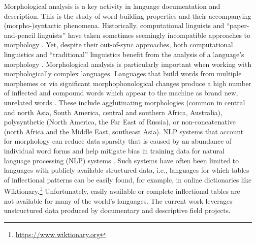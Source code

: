 Morphological analysis is a key activity in language documentation and description. This is the study of word-building properties and their accompanying (morpho-)syntactic phenomena. Historically, computational linguists and ``paper-and-pencil linguists'' have taken sometimes seemingly incompatible approaches to morphology \citep{sproat_1992,karttunen_2005}. Yet, despite their out-of-sync approaches, both computational linguistics and ``traditional'' linguistics benefit from the analysis of a language's morphology \citep{cotterell_labeled_2015}. Morphological analysis is particularly important when working with morphologically complex languages.  Languages that build words from multiple morphemes or via significant morphophonological changes produce a high number of inflected and compound words which appear to the machine as brand new, unrelated words \citep{dreyer_discovering_2011,goldsmith_computational_2017,hammarstrom_unsupervised_2011,kann_neural_2016,ruokolainen_supervised_2013}. These include agglutinating morphologies (common in central and north Asia, South America, central and southern Africa, Australia), polysynthetic (North America, the Far East of Russia), or non-concatenative (north Africa and the Middle East, southeast Asia). NLP systems that account for morphology can reduce data sparsity that is caused by an abundance of individual word forms \citep{mccarthy-etal-2019-sigmorphon,vylomova2020sigmorphon} and help mitigate bias in training data for natural language processing (NLP) systems \citep{zmigrod-etal-2019-counterfactual}. Such systems have often been limited to languages with publicly available structured data, i.e., languages for which tables of inflectional patterns can be easily found, for example, in online dictionaries like Wiktionary.\footnote{\url{https://www.wiktionary.org}} Unfortunately, easily available or complete inflectional tables are not available for many of the world's languages. The current work leverages unstructured data produced by documentary and descriptive field projects.
%

